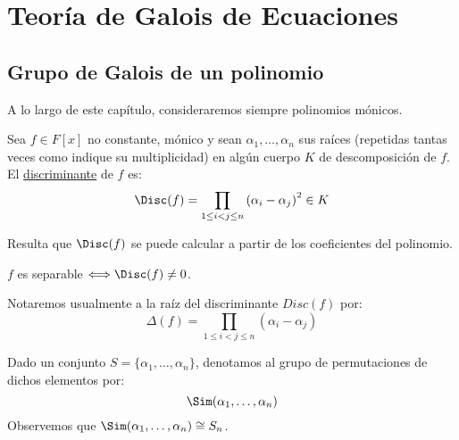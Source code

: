 \chapter{Teoría de Galois de Ecuaciones}
\section{Grupo de Galois de un polinomio}
\noindent
A lo largo de este capítulo, consideraremos siempre polinomios mónicos.

\begin{definicion} %
    Sea $f\in F[x]$ no constante, mónico y sean $\alpha_1, \ldots, \alpha_n$ sus raíces (repetidas tantas veces como indique su multiplicidad) en algún cuerpo $K$ de descomposición de $f$. El \underline{discriminante} de $f$ es:
    \begin{equation*}
        \Disc(f) = \prod_{1\leq i<j \leq n} {(\alpha_i-\alpha_j)}^{2} \in K
    \end{equation*}
\end{definicion}

\noindent
Resulta que $\Disc(f)$ se puede calcular a partir de los coeficientes del polinomio.

\begin{observacion}
    $f$ es separable $\Longleftrightarrow \Disc(f)\neq 0$. %
\end{observacion}

\begin{notacion}
    Notaremos usualmente a la raíz del discriminante $Disc(f)$ por:
    \begin{equation*}
        \Delta(f) = \prod_{1\leq i < j \leq n}(\alpha_i-\alpha_j)
    \end{equation*}
\end{notacion}

\begin{notacion} %
    Dado un conjunto $S = \{\alpha_1, \ldots, \alpha_n\}$, denotamos al grupo de permutaciones de dichos elementos por:
    \begin{equation*}
        \Sim(\alpha_1, \ldots, \alpha_n)
    \end{equation*}
    Observemos que $\Sim(\alpha_1,\ldots, \alpha_n)\cong S_n$.
\end{notacion}

